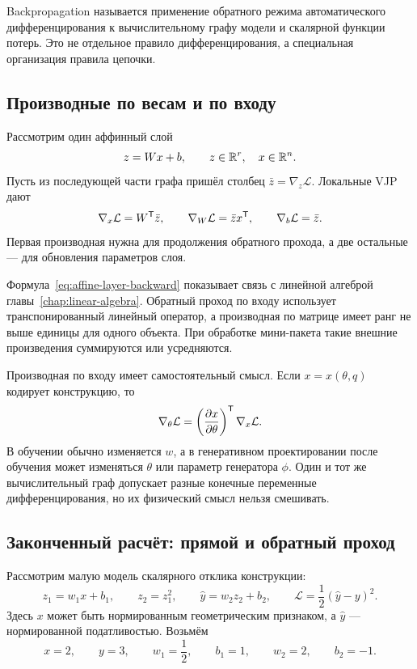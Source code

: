 \begin{definition}
Backpropagation называется применение обратного режима автоматического дифференцирования к вычислительному графу модели и скалярной функции потерь. Это не отдельное правило дифференцирования, а специальная организация правила цепочки.
\end{definition}

\subsection{Производные по весам и по входу}
Рассмотрим один аффинный слой
\begin{equation}
 z=Wx+b,
 \qquad
 z\in\mathbb{R}^r,
 \quad
 x\in\mathbb{R}^n.
\end{equation}
Пусть из последующей части графа пришёл столбец $\bar z=\nabla_z\mathcal L$. Локальные VJP дают
\begin{equation}
\label{eq:affine-layer-backward}
 \nabla_x\mathcal L=W^{\mathsf{T}}\bar z,
 \qquad
 \nabla_W\mathcal L=\bar z x^{\mathsf{T}},
 \qquad
 \nabla_b\mathcal L=\bar z.
\end{equation}
Первая производная нужна для продолжения обратного прохода, а две остальные --- для обновления параметров слоя.

Формула~\eqref{eq:affine-layer-backward} показывает связь с линейной алгеброй главы~\ref{chap:linear-algebra}. Обратный проход по входу использует транспонированный линейный оператор, а производная по матрице имеет ранг не выше единицы для одного объекта. При обработке мини-пакета такие внешние произведения суммируются или усредняются.

Производная по входу имеет самостоятельный смысл. Если $x=x(\theta,q)$ кодирует конструкцию, то
\begin{equation}
 \nabla_\theta\mathcal L
 =
 \left(\frac{\partial x}{\partial \theta}\right)^{\mathsf{T}}
 \nabla_x\mathcal L.
\end{equation}
В обучении обычно изменяется $w$, а в генеративном проектировании после обучения может изменяться $\theta$ или параметр генератора $\phi$. Один и тот же вычислительный граф допускает разные конечные переменные дифференцирования, но их физический смысл нельзя смешивать.

\subsection{Законченный расчёт: прямой и обратный проход}
\label{subsec:worked-forward-backward}
Рассмотрим малую модель скалярного отклика конструкции:
\begin{equation}
\label{eq:worked-model}
 z_1=w_1x+b_1,
 \qquad
 z_2=z_1^2,
 \qquad
 \widehat y=w_2z_2+b_2,
 \qquad
 \mathcal L=\frac12(\widehat y-y)^2.
\end{equation}
Здесь $x$ может быть нормированным геометрическим признаком, а $\widehat y$ --- нормированной податливостью. Возьмём
\begin{equation}
 x=2,
 \qquad
 y=3,
 \qquad
 w_1=\frac12,
 \qquad
 b_1=1,
 \qquad
 w_2=2,
 \qquad
 b_2=-1.
\end{equation}

